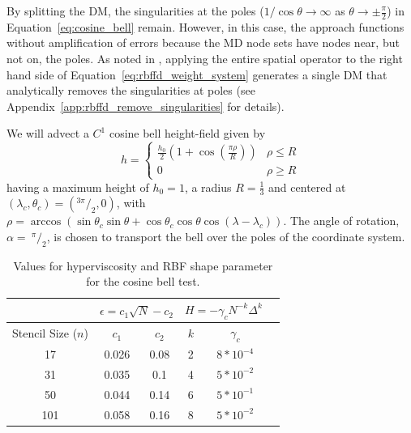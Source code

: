 \documentclass{report}
\begin{document}
By splitting the DM, the singularities at the poles ($1 / \cos{\theta} \rightarrow \infty$ as $\theta \rightarrow \pm\frac{\pi}{2}$) in Equation~\ref{eq:cosine_bell} remain. However, in this case, the approach functions without amplification of errors because the MD node sets have nodes near, but not on, the poles. As noted in \cite{FlyerWright07, FornbergLehto11}, applying the entire spatial operator to the right hand side of Equation~\ref{eq:rbffd_weight_system} generates a single DM that analytically removes the singularities at poles (see Appendix~\ref{app:rbffd_remove_singularities} for details). 

We will advect a $C^1$ cosine bell height-field given by
\begin{equation*}
h  =
\begin{cases}
\frac{h_0}{2} (1 + \cos(\frac{\pi \rho}{R}))  & \rho \le R  \\
 0 &  \rho \geq R
\end{cases}
\end{equation*}
having a maximum height of $h_0 = 1$, a radius $R = \frac{1}{3}$ and centered at $(\lambda_c, \theta_c) = (^{3\pi}/_{2}, 0)$, with 
$\rho = \arccos( \sin \theta_{c} \sin \theta + \cos \theta_{c} \cos \theta \cos (\lambda - \lambda_{c}) )$.
The angle of rotation, $\alpha =\ ^{\pi}/_{2}$, is chosen to transport the bell over the poles of the coordinate system.

\begin{table}
\begin{center}
\caption{Values for hyperviscosity and RBF shape parameter for the cosine bell test. }
\label{tbl:cos_hv_params}
\begin{tabular}{|c|c|c|c|c|c|}
\hline		     & \multicolumn{2}{c|}{$\epsilon = c_1 \sqrt{N} - c_2$} & \multicolumn{2}{c|}{$H = -\gamma_{c} N^{-k} \Delta^{k}$ } \\ \hline
Stencil Size ($n$) & $c_{1}$ & $c_{2}$ & $k$ & $\gamma_c$ \\ \hline
17 & 0.026 & 0.08 & 2 & $8 * 10^{-4}$ \\
31 & 0.035 & 0.1 & 4 & $5 * 10^{-2}$ \\
50 & 0.044 & 0.14 & 6 & $5 * 10^{-1}$ \\
101 & 0.058 & 0.16 & 8 & $5 * 10^{-2}$ \\ \hline
\end{tabular}
\end{center}
\end{table}
\end{document}
